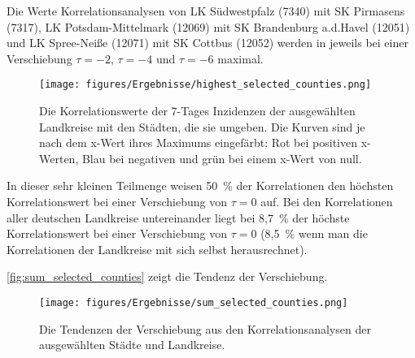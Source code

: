 Die Werte Korrelationsanalysen von LK Südwestpfalz (7340) mit SK Pirmasens (7317), LK Potsdam-Mittelmark (12069) mit SK Brandenburg a.d.Havel (12051) und LK Spree-Neiße (12071) mit SK Cottbus (12052) werden in jeweils bei einer Verschiebung $\tau=-2$, $\tau=-4$ und $\tau=-6$ maximal.
\begin{figure}[H]
    \centering
    \texttt{[image: figures/Ergebnisse/highest\_selected\_counties.png]}
    \caption{Die Korrelationswerte der 7-Tages Inzidenzen der ausgewählten Landkreise mit den Städten, die sie umgeben. Die Kurven sind je nach dem x-Wert ihres Maximums eingefärbt: Rot bei positiven x-Werten, Blau bei negativen und grün bei einem x-Wert von null.}
    \label{fig:highest_selected_counties}
\end{figure}

In dieser sehr kleinen Teilmenge weisen 50~\% der Korrelationen den höchsten Korrelationswert bei einer Verschiebung von $\tau = 0$ auf.
Bei den Korrelationen aller deutschen Landkreise untereinander liegt bei 8,7~\% der höchste Korrelationswert bei einer Verschiebung von $\tau= 0$ (8,5~\% wenn man die Korrelationen der Landkreise mit sich selbst herausrechnet).

\autoref{fig:sum_selected_counties} zeigt die Tendenz der Verschiebung.
\begin{figure}
    \centering
    \texttt{[image: figures/Ergebnisse/sum\_selected\_counties.png]}
    \caption{Die Tendenzen der Verschiebung aus den Korrelationsanalysen der ausgewählten Städte und Landkreise.}
    \label{fig:sum_selected_counties}
\end{figure}